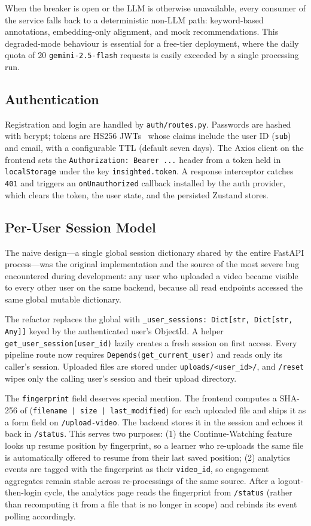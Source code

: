 \documentclass[conference]{IEEEtran}
\begin{document}
When the breaker is open or the LLM is otherwise unavailable, every consumer of the service falls back to a deterministic non-LLM path: keyword-based annotations, embedding-only alignment, and mock recommendations. This degraded-mode behaviour is essential for a free-tier deployment, where the daily quota of 20 \texttt{gemini-2.5-flash} requests is easily exceeded by a single processing run.

\subsection{Authentication}

Registration and login are handled by \texttt{auth/routes.py}. Passwords are hashed with bcrypt; tokens are HS256 JWTs~\cite{jwt} whose claims include the user ID (\texttt{sub}) and email, with a configurable TTL (default seven days). The Axios client on the frontend sets the \texttt{Authorization: Bearer ...} header from a token held in \texttt{localStorage} under the key \texttt{insighted.token}. A response interceptor catches \texttt{401} and triggers an \texttt{onUnauthorized} callback installed by the auth provider, which clears the token, the user state, and the persisted Zustand stores.

\subsection{Per-User Session Model}

The naive design---a single global session dictionary shared by the entire FastAPI process---was the original implementation and the source of the most severe bug encountered during development: any user who uploaded a video became visible to every other user on the same backend, because all read endpoints accessed the same global mutable dictionary.

The refactor replaces the global with \texttt{\_user\_sessions: Dict[str, Dict[str, Any]]} keyed by the authenticated user's ObjectId. A helper \texttt{get\_user\_session(user\_id)} lazily creates a fresh session on first access. Every pipeline route now requires \texttt{Depends(get\_current\_user)} and reads only its caller's session. Uploaded files are stored under \texttt{uploads/<user\_id>/}, and \texttt{/reset} wipes only the calling user's session and their upload directory.

The \texttt{fingerprint} field deserves special mention. The frontend computes a SHA-256 of (\texttt{filename | size | last\_modified}) for each uploaded file and ships it as a form field on \texttt{/upload-video}. The backend stores it in the session and echoes it back in \texttt{/status}. This serves two purposes: (1) the Continue-Watching feature looks up resume position by fingerprint, so a learner who re-uploads the same file is automatically offered to resume from their last saved position; (2) analytics events are tagged with the fingerprint as their \texttt{video\_id}, so engagement aggregates remain stable across re-processings of the same source. After a logout-then-login cycle, the analytics page reads the fingerprint from \texttt{/status} (rather than recomputing it from a file that is no longer in scope) and rebinds its event polling accordingly.
\end{document}
